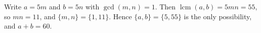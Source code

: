 Write $a=5m$ and $b=5n$ with $\gcd(m,n)=1$. Then $\operatorname{lcm}(a,b)=5mn=55$, so $mn=11$, and $\{m,n\}=\{1,11\}$. Hence $\{a,b\}=\{5,55\}$ is the only possibility, and $a+b=\boxed{60}$.
